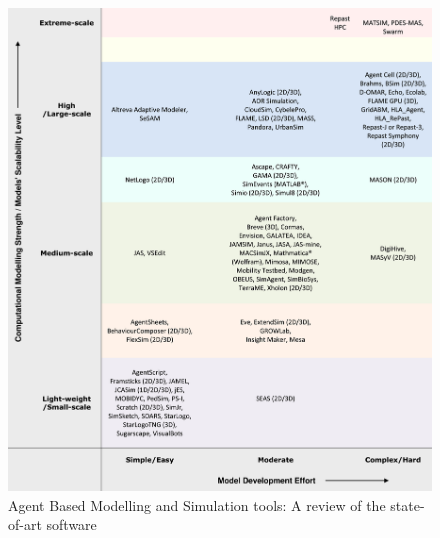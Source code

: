 \begin{figure}[H]
    \begin{center}
        \includegraphics[width=\textwidth]{img/1-s2.0-S1574013716301198-gr1_lrg.jpg}
        \caption{Agent Based Modelling and Simulation tools: A review of the state-of-art software \cite{ABAR201713}}
        \label{fig:Comparative_table}
    \end{center}
\end{figure}
